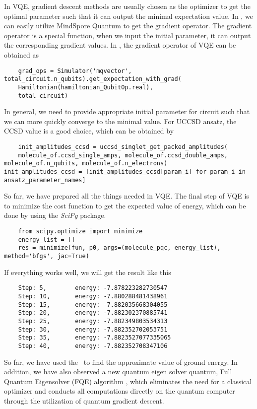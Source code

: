In VQE, gradient descent methods are usually chosen as the optimizer to get the optimal parameter such that it can output the minimal expectation value.
In \MindQuantum, we can easily utilize MindSpore Quantum to get the gradient operator.
The gradient operator is a special function, when we input the initial parameter, it can output the corresponding gradient values.
In \MindQuantum, the gradient operator of VQE can be obtained as
\begin{lstlisting}
    grad_ops = Simulator('mqvector', total_circuit.n_qubits).get_expectation_with_grad(
    Hamiltonian(hamiltonian_QubitOp.real),
    total_circuit)
\end{lstlisting}
In general, we need to provide appropriate initial parameter for circuit such that we can more quickly converge to the minimal value. For UCCSD ansatz, the CCSD value is a good choice, which can be obtained by
\begin{lstlisting}
    init_amplitudes_ccsd = uccsd_singlet_get_packed_amplitudes(
    molecule_of.ccsd_single_amps, molecule_of.ccsd_double_amps, molecule_of.n_qubits, molecule_of.n_electrons)
init_amplitudes_ccsd = [init_amplitudes_ccsd[param_i] for param_i in ansatz_parameter_names]
\end{lstlisting}
So far, we have prepared all the things needed in VQE.
The final step of VQE is to minimize the cost function to get the expected value of energy, which can be done by using the \textit{SciPy} package.
\begin{lstlisting}
    from scipy.optimize import minimize
    energy_list = []
    res = minimize(fun, p0, args=(molecule_pqc, energy_list), method='bfgs', jac=True)
\end{lstlisting}
If everything works well, we will get the result like this
\begin{lstlisting}
    Step: 5,        energy: -7.878223282730547
    Step: 10,       energy: -7.880288481438961
    Step: 15,       energy: -7.882035668304055
    Step: 20,       energy: -7.882302370885741
    Step: 25,       energy: -7.882349803534313
    Step: 30,       energy: -7.882352702053751
    Step: 35,       energy: -7.8823527077335065
    Step: 40,       energy: -7.882352708347106
\end{lstlisting}
So far, we have used the \MindQuantum\ to find the approximate value of ground energy. In addition, we have also observed a new quantum eigen solver quantum, Full Quantum Eigensolver (FQE) algorithm \cite{wei2020full}, which eliminates the need for a classical optimizer and conducts all computations directly on the quantum computer through the utilization of quantum gradient descent.
